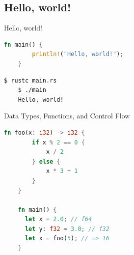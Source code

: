\subsection{Hello, world!}

\begin{Frame}[fragile]{Hello, world!}
  \begin{lstlisting}[language=Rust,gobble=4]
    fn main() {
        println!("Hello, world!");
    }
  \end{lstlisting}

  \xxx

  \begin{lstlisting}[gobble=4]
    $ rustc main.rs
    $ ./main
    Hello, world!
  \end{lstlisting}
\end{Frame}

\begin{Frame}[fragile]{Data Types, Functions, and Control Flow}
  \begin{lstlisting}[language=Rust,gobble=4]
    fn foo(x: i32) -> i32 {
        if x % 2 == 0 {
            x / 2
        } else {
            x * 3 + 1
        }
    }

    fn main() {
      let x = 2.0; // f64
      let y: f32 = 3.0; // f32
      let x = foo(5); // => 16
    }
  \end{lstlisting}
\end{Frame}

